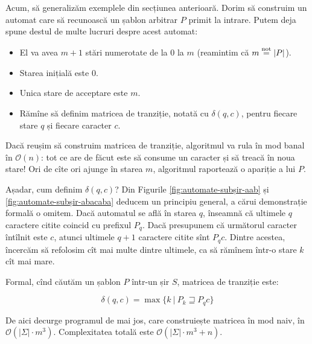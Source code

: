 \documentclass[../main.tex]{subfiles}
\begin{document}
Acum, să generalizăm exemplele din secțiunea anterioară. Dorim să construim un
automat care să recunoască un șablon arbitrar $P$ primit la intrare. Putem
deja spune destul de multe lucruri despre acest automat:

\begin{itemize}
\item El va avea $m + 1$ stări numerotate de la $0$ la $m$ (reamintim că $m \stackrel{\text{not}}{=} |P|$).
\item Starea inițială este $0$.
\item Unica stare de acceptare este $m$.
\item Rămîne să definim matricea de tranziție, notată cu $\delta(q, c)$,
  pentru fiecare stare $q$ și fiecare caracter $c$.
\end{itemize}

Dacă reușim să construim matricea de tranziție, algoritmul va rula în mod
banal în $\mathcal{O}(n)$: tot ce are de făcut este să consume un caracter și
să treacă în noua stare! Ori de cîte ori ajunge în starea $m$, algoritmul
raportează o apariție a lui $P$.

Așadar, cum definim $\delta(q, c)$? Din Figurile \ref{fig:automate-subșir-aab}
și \ref{fig:automate-subșir-abacaba} deducem un principiu general, a cărui
demonstrație formală o omitem. Dacă automatul se află în starea $q$, înseamnă
că ultimele $q$ caractere citite coincid cu prefixul $P_q$. Dacă presupunem că
următorul caracter întîlnit este $c$, atunci ultimele $q + 1$ caractere citite
sînt $P_{q}c$. Dintre acestea, încercăm să refolosim cît mai multe dintre
ultimele, ca să rămînem într-o stare $k$ cît mai mare.

Formal, cînd căutăm un șablon $P$ într-un șir $S$, matricea de tranziție este:

$$\delta(q, c) = \max \{ k\ |\ P_k \sqsupseteq P_{q}c \}$$

De aici decurge programul de mai jos, care construiește matricea în mod naiv,
în $\mathcal{O}(|\Sigma| \cdot m^3)$. Complexitatea totală este
$\mathcal{O}(|\Sigma| \cdot m^3 + n)$.
\end{document}
